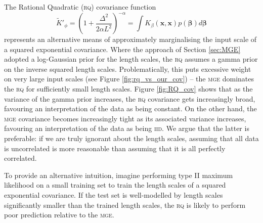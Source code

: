 \documentclass{article}
\renewcommand{\sc}[1]{{\scshape #1}}
\newcommand{\tK}{\tilde{K}}
\begin{document}
The Rational Quadratic (\sc{rq}) covariance function 
\begin{equation}
 \tK'_\phi = \left(1 + \frac{\Delta^2}{2 \alpha L^2} \right)^{-\alpha} = \int K_{\beta}(\mathbf{x},\mathbf{x}) p(\bm{\beta}) d\bm{\beta}
\end{equation}
represents an alternative means of approximately marginalising the input scale of a squared exponential covariance. Where the approach of Section \ref{sec:MGE} adopted a log-Gaussian prior for the length scales, the \sc{rq} assumes a gamma prior on the inverse squared length scales. Problematically, this puts excessive weight on very large input scales (see Figure \ref{fig:rq_vs_our_cov}) -- the \sc{mge} dominates the \sc{rq} for sufficiently small length scales. Figure \ref{fig:RQ_cov} shows that as the variance of the gamma prior increases, the \sc{rq} covariance gets increasingly broad, favouring an interpretation of the data as being constant. On the other hand, the \sc{mge} covariance becomes increasingly tight as its associated variance increases, favouring an interpretation of the data as being \sc{iid}. We argue that the latter is preferable: if we are truly ignorant about the length scales, assuming that all data is uncorrelated is more reasonable than assuming that it is all perfectly correlated. 

To provide an alternative intuition, imagine performing type II maximum likelihood on a small training set to train the length scales of a squared exponential covariance. If the test set is well-modelled by length scales significantly smaller than the trained length scales, the \sc{rq} is likely to perform poor prediction relative to the \sc{mge}.
\end{document}

